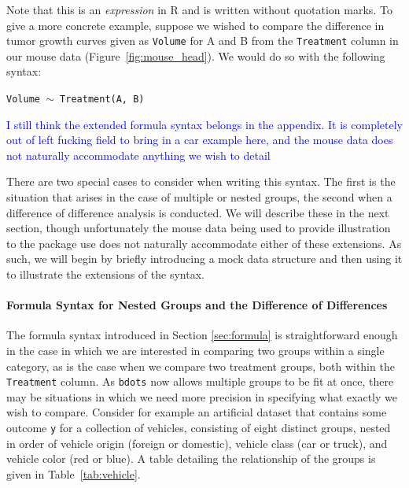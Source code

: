 \documentclass{article}
\providecommand{\cn}[1]{\textcolor{blue}{#1}}
\newcommand{\xt}{\texttt}%
\begin{document}
Note that this is an \textit{expression} in R and is written without quotation marks. To give a more concrete example, suppose we wished to compare the difference in tumor growth curves given as \xt{Volume} for A and B from the \xt{Treatment} column in our mouse data (Figure~\ref{fig:mouse_head}). We would do so with the following syntax:
\begin{center}
\tt Volume $\sim$ Treatment(A, B)
\end{center}

\cn{I still think the extended formula syntax belongs in the appendix. It is completely out of left fucking field to bring in a car example here, and the mouse data does not naturally accommodate anything we wish to detail}

There are two special cases to consider when writing this syntax. The first is the situation that arises in the case of multiple or nested groups, the second when a difference of difference analysis is conducted. We will describe these in the next section, though unfortunately the mouse data being used to provide illustration to the package use does not naturally accommodate either of these extensions. As such, we will begin by briefly introducing a mock data structure and then using it to illustrate the extensions of the syntax.


\paragraph{Formula Syntax for Nested Groups and the Difference of Differences} 

The formula syntax introduced in Section \ref{sec:formula} is straightforward enough in the case in which we are interested in comparing two groups within a single category, as is the case when we compare two treatment groups, both within the \xt{Treatment} column. As \xt{bdots} now allows multiple groups to be fit at once, there may be situations in which we need more precision in specifying what exactly we wish to compare. Consider for example an artificial dataset that contains some outcome \xt{y} for a collection of vehicles, consisting of eight distinct groups, nested in order of vehicle origin (foreign or domestic), vehicle class (car or truck), and vehicle color (red or blue). A table detailing the relationship of the groups is given in Table~\ref{tab:vehicle}.
\end{document}
